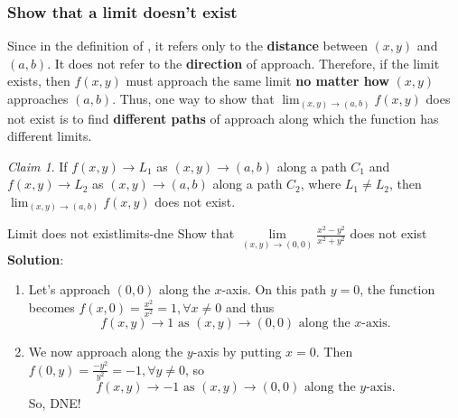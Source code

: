 \documentclass[math,code]{amznotes}
\theoremstyle{remark}
\newtheorem*{claim}{Claim}
\begin{document}
\subsubsection{Show that a limit doesn't exist}
Since in the definition of , it refers only to the \textbf{distance} between $(x,y)$ and $(a,b)$. It does not refer to the \textbf{direction} of approach. Therefore, if the limit exists, then $f(x,y)$ must approach the same limit \textbf{no matter how} $(x,y)$ approaches $(a,b)$. Thus, one way to show that $\lim_{(x,y) \to (a,b)} f(x,y)$ does not exist is to find {\color{red} \textbf{different paths}} of approach along which the function has different limits.
\begin{notebox}
    \begin{claim}
        If $f(x,y) \to L_1$ as $(x,y) \to (a,b)$ along a path $C_1$ and $f(x,y) \to L_2$ as $(x,y) \to (a,b)$ along a path $C_2$, where $L_1 \neq L_2$, then $\lim_{(x,y) \to (a,b)} f(x,y)$ does not exist.
    \end{claim}
\end{notebox}
\begin{exbox}{Limit does not exist}{limits-dne}
    Show that $\lim\limits_{(x,y) \to (0,0)} \frac{x^2-y^2}{x^2+y^2}$ does not exist \newline
    {\color{blue} \textbf{Solution}}:
    \begin{enumerate}
        \item Let's approach $(0,0)$ along the $x$-axis. On this path $y=0$, the function becomes $f(x,0)=\frac{x^2}{x^2}=1, \forall x \neq 0$ and thus
        \begin{displaymath}
            f(x,y) \to 1 \text{ as } (x,y) \to (0,0) \text{ along the }x \text{-axis.}
        \end{displaymath}
        \item We now approach along the $y$-axis by putting $x=0$. Then $f(0,y)=\frac{-y^2}{y^2}=-1, \forall y \neq 0$, so
        \begin{displaymath}
            f(x,y) \to -1 \text{ as } (x,y) \to (0,0) \text{ along the }y \text{-axis.}
        \end{displaymath}
        So, DNE!
    \end{enumerate}
\end{exbox}
\end{document}
